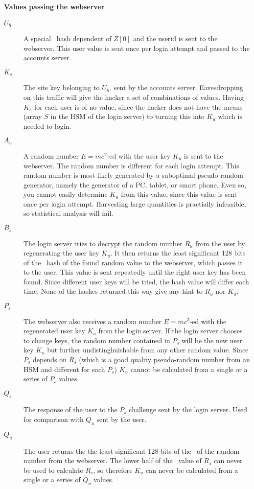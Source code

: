 \paragraph{Values passing the webserver}
\begin{description}
\item[$U_h$]	A special \SHA\ hash dependent of $Z[0]$ and the userid is sent to the webserver.
				This user value is sent once per login attempt and passed to the accounts server.
\item[$K_s$]	The site key belonging to $U_h$, sent by the accounts server.
				Eavesdropping on this traffic will give the hacker a set of combinations of values.
				Having $K_s$ for each user is of no value, since the hacker does not have the means
				(array $S$ in the HSM of the login server)
				to turning this into $K_u$ which is needed to login.
\item[$A_u$]	A random number $E=mc^2$-ed with the user key $K_u$ is sent to the webserver.
				The random number is different for each login attempt.
				This random number is most likely generated by a suboptimal pseudo-random generator,
				namely the generator of a PC, tablet, or smart phone.
				Even so, you cannot easily determine $K_u$ from this value,
				since this value is sent once per login attempt.
				Harvesting large quantities is practially infeasible,
				so statistical analysis will fail.
\item[$B_s$]	The login server tries to decrypt the random number $R_u$ from the user by regenerating the user key $K_u$.
				It then returns the least significant 128 bits of the \SHA\ hash of the found random value to the webserver,
				which passes it to the user.
				This value is sent repeatedly until the right user key has been found.
				Since different user keys will be tried, the hash value will differ each time.
				None of the hashes returned this way give any hint to $R_u$ nor $K_u$.
\item[$P_s$]	The webserver also receives a random number $E=mc^2$-ed with the regenerated user key $K_u$ from the login server.
				If the login server chooses to change keys,
				the random number contained in $P_s$ will be the new user key $K_u$
				but further undistinghuishable from any other random value.
				Since $P_s$ depends on $R_s$
				(which is a good quality pseudo-random number from an HSM and different for each $P_s$)
				$K_u$ cannot be calculated from a single or a series of $P_s$ values.
\item[$Q_s$]	The response of the user to the $P_s$ challenge sent by the login server.
				Used for comparison with $Q_u$ sent by the user.
\item[$Q_u$]	The user returns the the least significant 128 bits of the \SHA\ of the random number from the webserver.
				The lower half of the \SHA\ value of $R_s$ can never be used to calculate $R_s$,
				so therefore $K_u$ can never be calculated from a single or a series of $Q_u$ values.
\end{description}
